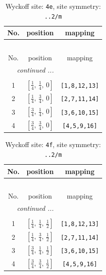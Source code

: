 \documentclass[fleqn,8pt]{jsarticle}
\begin{document}
\begin{longtable}{ccc}
\caption{Wyckoff site: {\tt 4e}, site symmetry: {\tt ..2/m}}
 \\
 \hline \hline
No. & position & mapping \\ \hline \endfirsthead

\multicolumn{2}{l}{\tablename\ \thetable{}} \\
 \hline \hline
No. & position & mapping \\ \hline \endhead

 \hline \hline
\multicolumn{2}{r}{\footnotesize\it continued ...} \\ \endfoot

 \hline \hline
\multicolumn{2}{r}{} \\ \endlastfoot

1 & $\left[ \frac{1}{4},\, \frac{1}{4},\, 0 \right]$ & {\tt [1,8,12,13]} \\ \hline
2 & $\left[ \frac{1}{4},\, \frac{3}{4},\, 0 \right]$ & {\tt [2,7,11,14]} \\ \hline
3 & $\left[ \frac{3}{4},\, \frac{1}{4},\, 0 \right]$ & {\tt [3,6,10,15]} \\ \hline
4 & $\left[ \frac{3}{4},\, \frac{3}{4},\, 0 \right]$ & {\tt [4,5,9,16]} \\
\end{longtable}
\renewcommand{\arraystretch}{1.2}
\begin{longtable}{ccc}
\caption{Wyckoff site: {\tt 4f}, site symmetry: {\tt ..2/m}}
 \\
 \hline \hline
No. & position & mapping \\ \hline \endfirsthead

\multicolumn{2}{l}{\tablename\ \thetable{}} \\
 \hline \hline
No. & position & mapping \\ \hline \endhead

 \hline \hline
\multicolumn{2}{r}{\footnotesize\it continued ...} \\ \endfoot

 \hline \hline
\multicolumn{2}{r}{} \\ \endlastfoot

1 & $\left[ \frac{1}{4},\, \frac{1}{4},\, \frac{1}{2} \right]$ & {\tt [1,8,12,13]} \\ \hline
2 & $\left[ \frac{1}{4},\, \frac{3}{4},\, \frac{1}{2} \right]$ & {\tt [2,7,11,14]} \\ \hline
3 & $\left[ \frac{3}{4},\, \frac{1}{4},\, \frac{1}{2} \right]$ & {\tt [3,6,10,15]} \\ \hline
4 & $\left[ \frac{3}{4},\, \frac{3}{4},\, \frac{1}{2} \right]$ & {\tt [4,5,9,16]} \\
\end{longtable}
\end{document}
